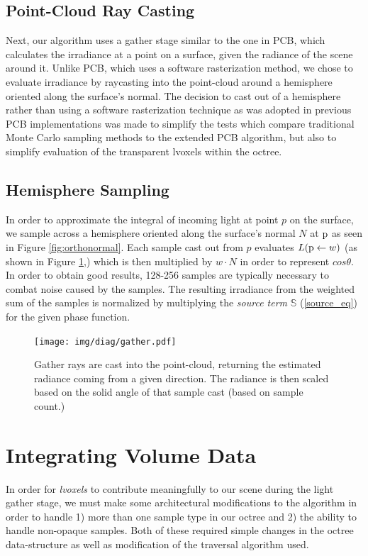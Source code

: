 \documentclass[12pt]{ucthesis}
\newcommand{\captionfonts}{\small\bf\ssp}
\begin{document}
\subsection{Point-Cloud Ray Casting}

Next, our algorithm uses a gather stage similar to the one in PCB, which calculates the irradiance at a point on a surface, given the radiance of the scene around it.  Unlike PCB, which uses a software rasterization method, we chose to evaluate irradiance by raycasting into the point-cloud around a hemisphere oriented along the surface's normal.  The decision to cast out of a hemisphere rather than using a software rasterization technique as was adopted in previous PCB implementations was made to simplify the tests which compare traditional Monte Carlo sampling methods to the extended PCB algorithm, but also to simplify evaluation of the transparent lvoxels within the octree.

\subsection{Hemisphere Sampling}

In order to approximate the integral of incoming light at point $p$ on the surface, we sample across a hemisphere oriented along the surface's normal $N$ at $\textup{p}$ as seen in Figure \ref{fig:orthonormal}.  Each sample cast out from $p$ evaluates $L(\textup{p} \leftarrow w)$ (as shown in Figure \ref{fig:gather},) which is then multiplied by $w \cdot N$ in order to represent $cos\theta$.  In order to obtain good results, 128-256 samples are typically necessary to combat noise caused by the samples.  The resulting irradiance from the weighted sum of the samples is normalized by multiplying the \textit{source term} $\mathbb{S}$ (\ref{source_eq}) for the given phase function. 

\begin{figure}[h!]
    \centering
    \texttt{[image: img/diag/gather.pdf]}
    \captionfonts
    \caption{Gather rays are cast into the point-cloud, returning the estimated radiance coming from a given direction.  The radiance is then scaled based on the solid angle of that sample cast (based on sample count.)}
    \label{fig:gather}
\end{figure}

\section{Integrating Volume Data}
In order for \textit{lvoxels} to contribute meaningfully to our scene during the light gather stage, we must make some architectural modifications to the algorithm in order to handle 1) more than one sample type in our octree and 2) the ability to handle non-opaque samples.  Both of these required simple changes in the octree data-structure as well as modification of the traversal algorithm used.
\end{document}
